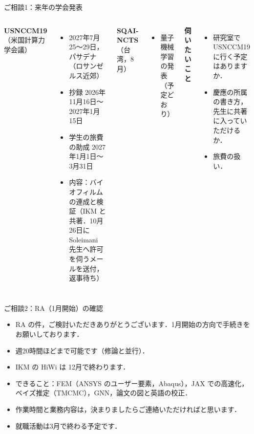 \documentclass[aspectratio=169,11pt]{beamer}
\begin{document}
\begin{frame}{ご相談1：来年の学会発表}
\begin{columns}[T]
\textbf{USNCCM19}（米国計算力学会議）
\begin{itemize}\small
  \item 2027年7月25〜29日，パサデナ（ロサンゼルス近郊）
  \item 抄録 2026年11月16日〜2027年1月15日
  \item 学生の旅費の助成 2027年1月1日〜3月31日
  \item 内容：バイオフィルムの連成と検証（IKM と共著．10月26日に Soleimani 先生へ許可を伺うメールを送付，返事待ち）
\end{itemize}
\textbf{SQAI-NCTS}（台湾，8月）
\begin{itemize}\small
  \item 量子機械学習の発表（予定どおり）
\end{itemize}
\vspace{6pt}
\textbf{伺いたいこと}
\begin{itemize}\small
  \item 研究室で USNCCM19 に行く予定はありますか．
  \item 慶應の所属の書き方，先生に共著に入っていただけるか．
  \item 旅費の扱い．
\end{itemize}
\end{columns}
\end{frame}

\begin{frame}{ご相談2：RA（1月開始）の確認}
\begin{itemize}\setlength{\itemsep}{6pt}
  \item RA の件，ご検討いただきありがとうございます．1月開始の方向で手続きをお願いしております．
  \item 週20時間ほどまで可能です（修論と並行）．
  \item IKM の HiWi は 12月で終わります．
  \item できること：FEM（ANSYS のユーザー要素，Abaqus），JAX での高速化，ベイズ推定（TMCMC），GNN，論文の図と英語の校正．
  \item 作業時間と業務内容は，決まりましたらご連絡いただければと思います．
  \item 就職活動は3月で終わる予定です．
\end{itemize}
\end{frame}
\end{document}
